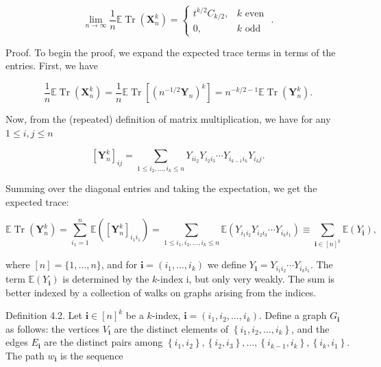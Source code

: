 \documentclass[10pt]{article}
\begin{document}
$$
\lim _{n \rightarrow \infty} \frac{1}{n} \mathbb{E} \operatorname{Tr}\left(\mathbf{X}_{n}^{k}\right)=\left\{\begin{array}{ll}
t^{k / 2} C_{k / 2}, & k \text { even } \\
0, & k \text { odd }
\end{array} .\right.
$$

Proof. To begin the proof, we expand the expected trace terms in terms of the entries. First, we have


\begin{equation*}
\frac{1}{n} \mathbb{E} \operatorname{Tr}\left(\mathbf{X}_{n}^{k}\right)=\frac{1}{n} \mathbb{E} \operatorname{Tr}\left[\left(n^{-1 / 2} \mathbf{Y}_{n}\right)^{k}\right]=n^{-k / 2-1} \mathbb{E} \operatorname{Tr}\left(\mathbf{Y}_{n}^{k}\right) . \tag{4.1}
\end{equation*}


Now, from the (repeated) definition of matrix multiplication, we have for any $1 \leq i, j \leq n$

$$
\left[\mathbf{Y}_{n}^{k}\right]_{i j}=\sum_{1 \leq i_{2}, \ldots, i_{k} \leq n} Y_{i i_{2}} Y_{i_{2} i_{3}} \cdots Y_{i_{k-1} i_{k}} Y_{i_{k} j} .
$$

Summing over the diagonal entries and taking the expectation, we get the expected trace:


\begin{equation*}
\mathbb{E} \operatorname{Tr}\left(\mathbf{Y}_{n}^{k}\right)=\sum_{i_{1}=1}^{n} \mathbb{E}\left(\left[\mathbf{Y}_{n}^{k}\right]_{i_{1} i_{1}}\right)=\sum_{1 \leq i_{1}, i_{2}, \ldots, i_{k} \leq n} \mathbb{E}\left(Y_{i_{1} i_{2}} Y_{i_{2} i_{3}} \cdots Y_{i_{k} i_{1}}\right) \equiv \sum_{\mathbf{i} \in[n]^{k}} \mathbb{E}\left(Y_{\mathbf{i}}\right), \tag{4.2}
\end{equation*}


where $[n]=\{1, \ldots, n\}$, and for $\mathbf{i}=\left(i_{1}, \ldots, i_{k}\right)$ we define $Y_{\mathbf{i}}=Y_{i_{1} i_{2}} \cdots Y_{i_{k} i_{1}}$. The term $\mathbb{E}\left(Y_{\mathbf{i}}\right)$ is determined by the $k$-index i, but only very weakly. The sum is better indexed by a collection of walks on graphs arising from the indices.

Definition 4.2. Let $\mathbf{i} \in[n]^{k}$ be a $k$-index, $\mathbf{i}=\left(i_{1}, i_{2}, \ldots, i_{k}\right)$. Define a graph $G_{\mathbf{i}}$ as follows: the vertices $V_{\mathbf{i}}$ are the distinct elements of $\left\{i_{1}, i_{2}, \ldots, i_{k}\right\}$, and the edges $E_{\mathbf{i}}$ are the distinct pairs among $\left\{i_{1}, i_{2}\right\},\left\{i_{2}, i_{3}\right\}, \ldots,\left\{i_{k-1}, i_{k}\right\},\left\{i_{k}, i_{1}\right\}$. The path $w_{\mathbf{i}}$ is the sequence
\end{document}
